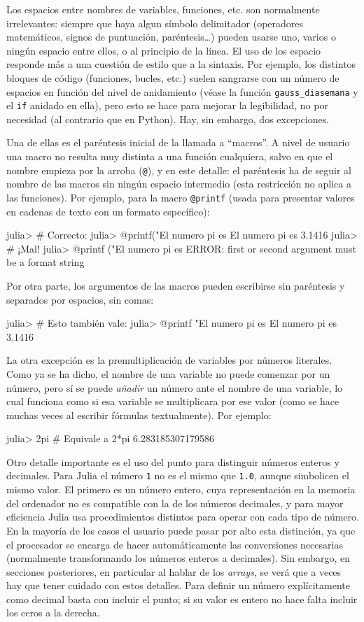 ﻿\documentclass{article}
\newcommand{\jl}{\texttt}
\begin{document}
Los espacios entre nombres de variables, funciones, etc. son normalmente irrelevantes: siempre que haya algun símbolo delimitador (operadores matemáticos, signos de puntuación, paréntesis\ldots) pueden usarse uno, varios o ningún espacio entre ellos, o al principio de la línea. El uso de los espacio responde más a una cuestión de estilo que a la sintaxis. Por ejemplo, los distintos bloques de código (funciones, bucles, etc.) suelen sangrarse con un número de espacios en función del nivel de anidamiento (véase la función \jl{gauss_diasemana} y el \jl{if} anidado en ella), pero esto se hace para mejorar la legibilidad, no por necesidad (al contrario que en Python). Hay, sin embargo, dos excepciones.

Una de ellas es el paréntesis inicial de la llamada a ``macros''. A nivel de usuario una macro no resulta muy distinta a una función cualquiera, salvo en que el nombre empieza por la arroba (\jl{@}), y en este detalle: el paréntesis ha de seguir al nombre de las macros sin ningún espacio intermedio (esta restricción no aplica a las funciones). Por ejemplo, para la macro \jl{@printf} (usada para presentar valores en cadenas de texto con un formato específico):

julia> # Correcto:
julia> @printf("El numero pi es %
El numero pi es 3.1416
julia> # ¡Mal!
julia> @printf ("El numero pi es %
ERROR: first or second argument must be a format string

Por otra parte, los argumentos de las macros pueden escribirse sin
paréntesis y separados por espacios, sin comas:

julia> # Esto también vale:
julia> @printf "El numero pi es %
El numero pi es 3.1416

La otra excepción es la premultiplicación de variables por números literales. Como ya se ha dicho, el nombre de una variable no puede comenzar por un número, pero sí se puede \emph{añadir} un número ante el nombre de una variable, lo cual funciona como si esa variable se multiplicara por ese valor (como se hace muchas veces al escribir fórmulas textualmente). Por ejemplo:

julia> 2pi # Equivale a 2*pi
6.283185307179586

Otro detalle importante es el uso del punto para distinguir números enteros y decimales. Para Julia el número \jl{1} no es el mismo que \jl{1.0}, aunque simbolicen el mismo valor. El primero es un número entero, cuya representación en la memoria del ordenador no es compatible con la de los números decimales, y para mayor eficiencia Julia usa procedimientos distintos para operar con cada tipo de número. En la mayoría de los casos el usuario puede pasar por alto esta distinción, ya que el procesador se encarga de hacer automáticamente las conversiones necesarias (normalmente transformando los números enteros a decimales). Sin embargo, en secciones posteriores, en particular al hablar de los \emph{arrays}, se verá que a veces hay que tener cuidado con estos detalles. Para definir un número explícitamente como decimal basta con incluir el punto; si su valor es entero no hace falta incluir los ceros a la derecha.
\end{document}
